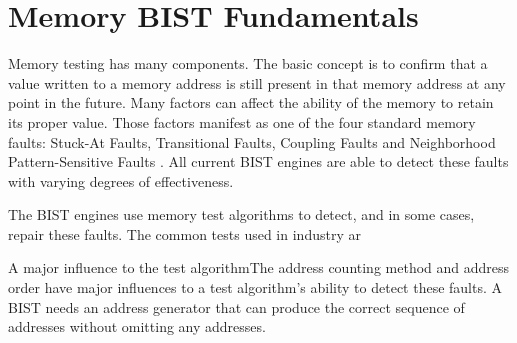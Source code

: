 \chapter{Memory BIST Fundamentals}
\label{chap:background}
Memory testing has many components.  The basic concept is to confirm that a value written to a memory address is still present in that memory address at any point in the future.  Many factors can affect the ability of the memory to retain its proper value.  Those factors manifest as one of the four standard memory faults: Stuck-At Faults, Transitional Faults, Coupling Faults and Neighborhood Pattern-Sensitive Faults \cite{VanDeGoor1991}. All current BIST engines are able to detect these faults with varying degrees of effectiveness.

The BIST engines use memory test algorithms to detect, and in some cases, repair these faults. The common tests used in industry ar  

A major influence to the test algorithmThe address counting method and address order have major influences to a test algorithm's ability to detect these faults.   A BIST needs an address generator that can produce the correct sequence of addresses without omitting any addresses.  







